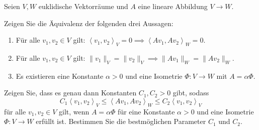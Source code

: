 \begin{Problem}
	Seien $V,W$ euklidische Vektorräume und $A$ eine lineare Abbildung $V\to W$. 
	\begin{parts}
	\item Zeigen Sie die Äquivalenz der folgenden drei Aussagen:
		\begin{enumerate}[label=\roman*.]
			\item F\"{u}r alle $v_1,v_2\in V$ gilt: $\left<v_1,v_2 \right>_V=0\implies \left<Av_1, Av_2 \right>_W=0$.
			\item F\"{u}r alle $v_1,v_2\in V$ gilt: $\|v_1\|_V=\|v_2\|_V\implies \|Av_1\|_W=\|Av_2\|_W$.
			\item Es existieren eine Konstante $\alpha>0$ und eine Isometrie $\Phi:V\to W$ mit $A=\alpha\Phi$.
		\end{enumerate}
	\item Zeigen Sie, dass es genau dann Konstanten $C_1,C_2>0$ gibt, sodass
		\[
		C_1\left<v_1,v_2 \right>_V\le \left<Av_1,Av_2 \right>_W\le C_2\left<v_1,v_2 \right>_V
	\]
	f\"{u}r alle $v_1,v_2\in V$ gilt, wenn $A=\alpha\Phi$ f\"{u}r eine Konstante $\alpha>0$ und eine Isometrie $\Phi:V\to W$ erf\"{u}llt ist. Bestimmen Sie die bestmöglichen Parameter $C_1$ und $C_2$.
	\end{parts}
\end{Problem}
